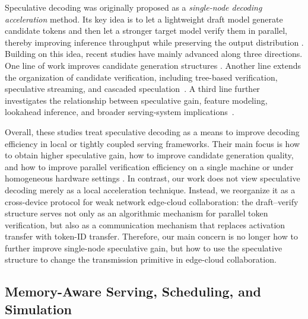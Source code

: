 \documentclass[a4paper,fleqn]{cas-dc}
\begin{document}
Speculative decoding was originally proposed as a \emph{single-node decoding acceleration} method. Its key idea is to let a lightweight draft model generate candidate tokens and then let a stronger target model verify them in parallel, thereby improving inference throughput while preserving the output distribution \cite{stern2018blockwise,leviathan2023speculative}. Building on this idea, recent studies have mainly advanced along three directions. One line of work improves candidate generation structures \cite{cai2024medusa,ankner2024hydra}. Another line extends the organization of candidate verification, including tree-based verification, speculative streaming, and cascaded speculation~\cite{miao2024specinfer,bhendawade2024speculativestreaming,narasimhan2025fastercascades}. A third line further investigates the relationship between speculative gain, feature modeling, lookahead inference, and broader serving-system implications~\cite{li2024eagle,fu2026scaling,kumar2026speculative,miao2025efficient_llm_serving_survey}.

Overall, these studies treat speculative decoding as a means to improve decoding efficiency in local or tightly coupled serving frameworks. Their main focus is how to obtain higher speculative gain, how to improve candidate generation quality, and how to improve parallel verification efficiency on a single machine or under homogeneous hardware settings \cite{leviathan2023speculative,cai2024medusa,miao2024specinfer,li2024eagle,fu2026scaling,kumar2026speculative}. In contrast, our work does not view speculative decoding merely as a local acceleration technique. Instead, we reorganize it as a cross-device protocol for weak network edge-cloud collaboration: the draft--verify structure serves not only as an algorithmic mechanism for parallel token verification, but also as a communication mechanism that replaces activation transfer with token-ID transfer. Therefore, our main concern is no longer how to further improve single-node speculative gain, but how to use the speculative structure to change the transmission primitive in edge-cloud collaboration.

\subsection{Memory-Aware Serving, Scheduling, and Simulation}
\end{document}
